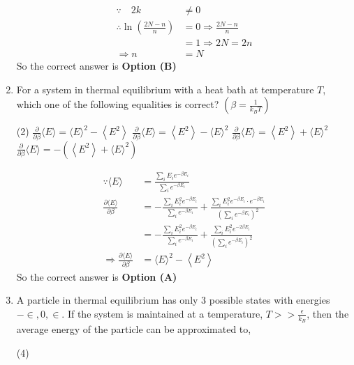\begin{enumerate}
\begin{answer}
\begin{align*}
\because \quad 2 k &\neq 0\\
\therefore \ln \left(\frac{2 N-n}{n}\right)&=0 \Rightarrow \frac{2 N-n}{n}\\&=1 \Rightarrow 2 N=2 n \\
\Rightarrow n&=N
\end{align*}
So the correct answer is \textbf{Option (B)}
\end{answer}	
\item For a system in thermal equilibrium with a heat bath at temperature $T$, which one of the following equalities is correct? $\left(\beta=\frac{1}{k_{B} T}\right)$
{}
\begin{tasks}(2)
\task[\textbf{A.}] $\frac{\partial}{\partial \beta}\langle E\rangle=\langle E\rangle^{2}-\left\langle E^{2}\right\rangle$
\task[\textbf{B.}] $\frac{\partial}{\partial \beta}\langle E\rangle=\left\langle E^{2}\right\rangle-\langle E\rangle^{2}$
\task[\textbf{C.}] $\frac{\partial}{\partial \beta}\langle E\rangle=\left\langle E^{2}\right\rangle+\langle E\rangle^{2}$
\task[\textbf{D.}] $\frac{\partial}{\partial \beta}\langle E\rangle=-\left(\left\langle E^{2}\right\rangle+\langle E\rangle^{2}\right)$
\end{tasks}
\begin{answer}
\begin{align*}
\because\langle E\rangle&=\frac{\sum_{i} E_{i} e^{-\beta E_{i}}}{\sum_{i} e^{-\beta E_{i}}}\\
\frac{\partial\langle E\rangle}{\partial \beta}&=-\frac{\sum_{i} E_{i}^{2} e^{-\beta E_{i}}}{\sum_{i} e^{-\beta E_{i}}}+\frac{\sum_{i} E_{i}^{2} e^{-\beta E_{i}} \cdot e^{-\beta E_{i}}}{\left(\sum_{i} e^{-\beta E_{i}}\right)^{2}}\\&=-\frac{\sum_{i} E_{i}^{2} e^{-\beta E_{i}}}{\sum_{i} e^{-\beta E_{i}}}+\frac{\sum_{i} E_{i}^{2} e^{-2 \beta E_{i}}}{\left(\sum_{i} e^{-\beta E_{i}}\right)^{2}}\\
\Rightarrow \frac{\partial\langle E\rangle}{\partial \beta}&=\langle E\rangle^{2}-\left\langle E^{2}\right\rangle
\end{align*}
So the correct answer is \textbf{Option (A)}
\end{answer}	
\item A particle in thermal equilibrium has only 3 possible states with energies $-\in, 0, \in .$ If the system is maintained at a temperature, $T>>\frac{\epsilon}{k_{B}}$, then the average energy of the particle can be approximated to,
{}
\begin{tasks}(4)

\end{tasks}
\end{enumerate}
